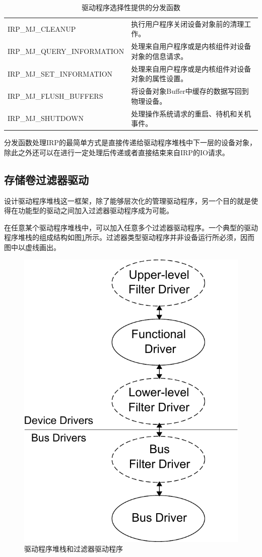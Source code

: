 \begin{table}[H]
\centering
\caption{驱动程序选择性提供的分发函数}
\begin{tabular}{|ll|}
\hline IRP\_MJ\_CLEANUP & 执行用户程序关闭设备对象前的清理工作。 \\
       IRP\_MJ\_QUERY\_INFORMATION & 处理来自用户程序或是内核组件对设备对象的信息请求。 \\
       IRP\_MJ\_SET\_INFORMATION & 处理来自用户程序或是内核组件对设备对象的属性设置。 \\
       IRP\_MJ\_FLUSH\_BUFFERS & 将设备对象Buffer中缓存的数据写回到物理设备。 \\
       IRP\_MJ\_SHUTDOWN & 处理操作系统请求的重启、待机和关机事件。 \\
\hline
\end{tabular}
\label{tab:option-handled-major-function}
\end{table}

分发函数处理IRP的最简单方式是直接传递给驱动程序堆栈中下一层的设备对象，除此之外还可以在进行一定处理后传递或者直接结束来自IRP的IO请求。

\subsection{存储卷过滤器驱动}
设计驱动程序堆栈这一框架，除了能够层次化的管理驱动程序，另一个目的就是使得在功能型的驱动之间加入过滤器驱动程序\cite{filterdrv2004}成为可能。

在任意某个驱动程序堆栈中，可以加入任意多个过滤器驱动程序。一个典型的驱动程序堆栈的组成结构如图\ref{fig:io-stack-filter}所示。过滤器类型驱动程序并非设备运行所必须，因而图中以虚线画出。
\begin{figure}[H]
\centering
\includegraphics[width=0.4\linewidth]{./graph/io-stack-filter}
\caption{驱动程序堆栈和过滤器驱动程序}
\label{fig:io-stack-filter}
\end{figure}


